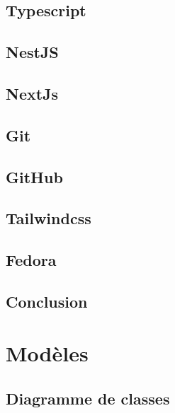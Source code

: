 \documentclass[12pt, a4paper]{report}
\begin{document}
    \subsection{Typescript}\label{sec:typescript}
    

    \subsection{NestJS}\label{sec:nestjs}
    

    \subsection{NextJs}\label{sec:nextjs}
    

    \subsection{Git}\label{sec:git}
    

    \subsection{GitHub}\label{sec:github}
    

    \subsection{Tailwindcss}\label{sec:tailwind}
    

    \subsection{Fedora}\label{sec:fedora}
    

    \subsection*{Conclusion}\label{sec:conclusion-choix-techniques}
    

    \newpage
    \section{Modèles}\label{sec:database-models}
    \subsection{Diagramme de classes}\label{subsec:class-diagram}
    
\end{document}
